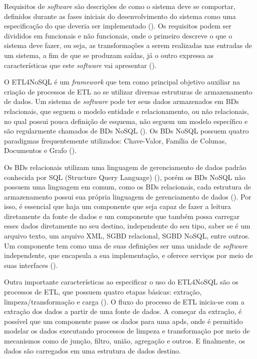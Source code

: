 Requisitos de \textit{software} são descrições de como o sistema deve se comportar, definidos durante as fases iniciais do desenvolvimento do sistema como uma especificação do que deveria ser implementado (\cite{sommerville:2013}). Os requisitos podem ser divididos em funcionais e não funcionais, onde o primeiro descreve o que o sistema deve fazer, ou seja, as transformações a serem realizadas nas entradas de um sistema, a fim de que se produzam saídas, já o outro expressa as características que este \textit{software} vai apresentar (\cite{sommerville:2013}). 

O ETL4NoSQL é um \textit{framework} que tem como principal objetivo auxiliar na criação de processos de ETL ao se utilizar diversas estruturas de armazenamento de dados. Um sistema de \textit{software} pode ter seus dados armazenados em BDs relacionais, que seguem o modelo entidade e relacionamento, ou não relacionais, no qual possui pouca definição de esquema, não seguem um modelo específico e são regularmente chamados de BDs NoSQL (\cite{fowler:2013}). Os BDs NoSQL possuem quatro paradigmas frequentemente utilizados: Chave-Valor, Família de Colunas, Documentos e Grafo (\cite{fowler:2013}).

Os BDs relacionais utilizam uma linguagem de gerenciamento de dados padrão conhecida por SQL (Structure Query Language) (\cite{fowler:2013}), porém os BDs NoSQL não possuem uma linguagem em comum, como os BDs relacionais, cada estrutura de armazenamento possui sua própria linguagem de gerenciamento de dados (\cite{fowler:2013}). Por isso, é essencial que haja um componente que seja capaz de fazer a leitura diretamente da fonte de dados e um componente que também possa carregar esses dados diretamente no seu destino, independente do seu tipo, saber se é um arquivo texto, um arquivo XML, SGBD relacional, SGBD NoSQL, entre outros. Um componente tem como uma de suas definições ser uma unidade de \textit{software} independente, que encapsula a sua implementação, e oferece serviços por meio de suas interfaces (\cite{itana:2005}).

Outra importante características ao especificar o uso do ETL4NoSQL são os processos de ETL, que possuem quatro etapas básicas: extração, limpeza/transformação e carga (\cite{kimball:2004}). O fluxo do processo de ETL inicia-se com a extração dos dados a partir de uma fonte de dados. A começar da extração, é possível que um componente passe os dados para uma \acp{apd}, onde é permitido modelar os dados executando processos de limpeza e transformação por meio de mecanismos como de junção, filtro, união, agregação e outros. E finalmente, os dados são carregados em uma estrutura de dados destino.

